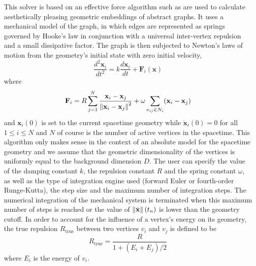 \documentclass[12pt,letterpaper]{report}
\begin{document}
This solver is based on an effective force algorithm such as are used to calculate aesthetically 
pleasing geometric embeddings of abstract graphs. It uses a mechanical model of the graph, in 
which edges are represented as springs governed by Hooke's law in conjunction with a universal 
inter-vertex repulsion and a small dissipative factor. The graph is then subjected to Newton's 
laws of motion from the geometry's initial state with zero initial velocity,
\begin{equation}
\frac {d^2\mathbf{x}_i}{dt^2} = k \frac {d\mathbf{x}_i}{dt} + \mathbf{F}_i(\mathbf{x})
\end{equation} 
where 
\begin{equation}
\mathbf{F}_i = R \sum_{j=1}^N \frac {\mathbf{x}_i - \mathbf{x}_j}{\left\lVert\mathbf{x}_i - \mathbf{x}_j\right\rVert^2} + 
            \omega \sum_{e_{ij}\in N_i} (\mathbf{x}_i - \mathbf{x}_j) 
\end{equation}
and $\mathbf{x}_i(0)$ is set to the current spacetime geometry while $\dot{\mathbf{x}}_i(0) = 0$ for all $1\le i\le 
N$ and $N$ of course is the number of active vertices in the spacetime. This algorithm only makes sense in 
the context of an absolute model for the spacetime geometry and we assume that the geometric dimensionality 
of the vertices is uniformly equal to the background dimension $D$. The user can specify the value of the 
damping constant $k$, the repulsion constant $R$ and the spring constant $\omega$, as well as the type of 
integration engine used (forward Euler or fourth-order Runge-Kutta), the step size and the maximum number 
of integration steps. The numerical integration of the mechanical system is terminated when this maximum 
number of steps is reached or the value of $\left\lVert\dot{\mathbf{x}}\right\rVert(t_n)$ is lower than the geometry cutoff. 
In order to account for the influence of a vertex's energy on its geometry, the true repulsion $R_{\mbox{true}}$ 
between two vertices $v_i$ and $v_j$ is defined to be 
\begin{equation*}
R_{\mbox{true}} = \frac {R}{1 + (E_i + E_j)/2}  
\end{equation*}
where $E_i$ is the energy of $v_i$.
\end{document}

